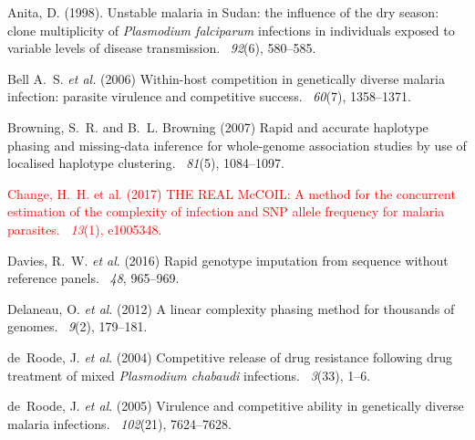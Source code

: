 \documentclass{bioinfo}
\newcounter{todocounter}
\newcommand{\done}[2][]
{\todo[color=green!40, #1]{#2}}
\newcommand{\donenum}[2][]
{\stepcounter{todocounter}\done[#1]{\thetodocounter: #2}}
\begin{document}
\begin{thebibliography}{}

Anita, D. (1998).
\newblock Unstable malaria in Sudan: the influence of the dry season: clone
  multiplicity of {\it Plasmodium falciparum} infections in individuals exposed to
  variable levels of disease transmission.
~{\em 92\/}(6), 580--585.

Bell A.~S. {\em et al.} (2006)
\newblock Within-host competition in genetically diverse malaria infection: parasite virulence and competitive success.
~{\em 60}(7), 1358--1371.

Browning, S.~R. and B.~L. Browning (2007)
\newblock Rapid and accurate haplotype phasing and missing-data inference for
  whole-genome association studies by use of localised haplotype clustering.
~{\em 81\/}(5), 1084--1097.

\textcolor{red}{Change, H.~H. et al. (2017)
\newblock THE REAL McCOIL: A method for the concurrent estimation of the complexity of infection and SNP allele frequency for malaria parasites.
~{\em 13\/}(1), e1005348.}
\donenum{Change, H.~H. et al. (2017)}

Davies, R.~W. {\em et al}. (2016)
Rapid genotype imputation from sequence without reference panels.
~{\em 48\/}, 965--969.

Delaneau, O. {\em et al}. (2012)
\newblock A linear complexity phasing method for thousands of genomes.
~{\em 9\/}(2), 179--181.

de~Roode, J. {\em et al}. (2004)
\newblock Competitive release of drug resistance following drug treatment of mixed {\it Plasmodium chabaudi} infections.
~{\em 3\/}(33), 1--6.

de~Roode, J. {\em et al}. (2005)
\newblock Virulence and competitive ability in genetically diverse malaria infections.
~{\em 102\/}(21), 7624--7628.


\end{thebibliography}
\end{document}
